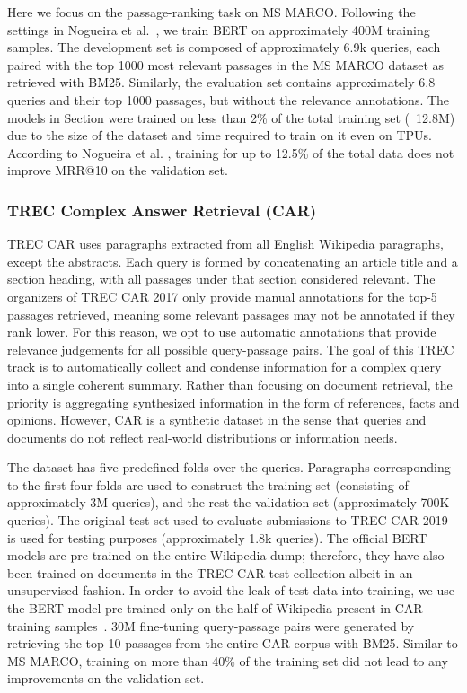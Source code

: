 Here we focus on the passage-ranking task on MS MARCO.
Following the settings in Nogueira et al.~\cite{}, we train BERT on approximately 400M training samples.
The development set is composed of approximately 6.9k queries, each paired with the top 1000 most relevant passages in the MS MARCO dataset as retrieved with BM25.
Similarly, the evaluation set contains approximately 6.8 queries and their top 1000 passages, but without the relevance annotations.
The models in Section  were trained on less than 2\% of the total training set (~12.8M) due to the size of the dataset and time required to train on it even on TPUs.
According to Nogueira et al. \cite{nogueira2019passage}, training for up to 12.5\% of the total data does not improve MRR@10 on the validation set.

\subsubsection{TREC Complex Answer Retrieval (CAR)}


TREC CAR \cite{dietz2017trec} uses paragraphs extracted from all English Wikipedia paragraphs, except the abstracts.
Each query is formed by concatenating an article title and a section heading, with all passages under that section considered relevant.
The organizers of TREC CAR 2017 only provide manual annotations for the top-5 passages retrieved, meaning some relevant passages may not be annotated if they rank lower.
For this reason, we opt to use automatic annotations that provide relevance judgements for all possible query-passage pairs.
The goal of this TREC track is to automatically collect and condense information for a complex query into a single coherent summary.
Rather than focusing on document retrieval, the priority is aggregating synthesized information in the form of references, facts and opinions.
However, CAR is a synthetic dataset in the sense that queries and documents do not reflect real-world distributions or information needs.

The dataset has five predefined folds over the queries.
Paragraphs corresponding to the first four folds are used to construct the training set (consisting of approximately 3M queries), and the rest the validation set (approximately 700K queries).
The original test set used to evaluate submissions to TREC CAR 2019 is used for testing purposes (approximately 1.8k queries).
The official BERT models are pre-trained on the entire Wikipedia dump; therefore, they have also been trained on documents in the TREC CAR test collection albeit in an unsupervised fashion.
In order to avoid the leak of test data into training, we use the BERT model pre-trained only on the half of Wikipedia present in CAR training samples~\cite{}.
30M fine-tuning query-passage pairs were generated by retrieving the top 10 passages from the entire CAR corpus with BM25.
Similar to MS MARCO, training on more than 40\% of the training set did not lead to any improvements on the validation set.

